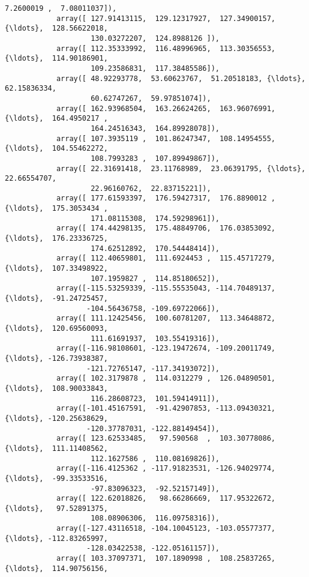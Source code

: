 \documentclass[11pt]{article}
\begin{document}
\begin{Verbatim}[commandchars=\\\{\}]
                    7.2600019 ,  7.08011037]),
            array([ 127.91413115,  129.12317927,  127.34900157, {\ldots},  128.56622018,
                    130.03272207,  124.8988126 ]),
            array([ 112.35333992,  116.48996965,  113.30356553, {\ldots},  114.90186901,
                    109.23586831,  117.38485586]),
            array([ 48.92293778,  53.60623767,  51.20518183, {\ldots},  62.15836334,
                    60.62747267,  59.97851074]),
            array([ 162.93968504,  163.26624265,  163.96076991, {\ldots},  164.4950217 ,
                    164.24516343,  164.89928078]),
            array([ 107.3935119 ,  101.86247347,  108.14954555, {\ldots},  104.55462272,
                    108.7993283 ,  107.89949867]),
            array([ 22.31691418,  23.11768989,  23.06391795, {\ldots},  22.66554707,
                    22.96160762,  22.83715221]),
            array([ 177.61593397,  176.59427317,  176.8890012 , {\ldots},  175.3053434 ,
                    171.08115308,  174.59298961]),
            array([ 174.44298135,  175.48849706,  176.03853092, {\ldots},  176.23336725,
                    174.62512892,  170.54448414]),
            array([ 112.40659801,  111.6924453 ,  115.45717279, {\ldots},  107.33498922,
                    107.1959827 ,  114.85180652]),
            array([-115.53259339, -115.55535043, -114.70489137, {\ldots},  -91.24725457,
                   -104.56436758, -109.69722066]),
            array([ 111.12425456,  100.60781207,  113.34648872, {\ldots},  120.69560093,
                    111.61691937,  103.55419316]),
            array([-116.98108601, -123.19472674, -109.20011749, {\ldots}, -126.73938387,
                   -121.72765147, -117.34193072]),
            array([ 102.3179878 ,  114.0312279 ,  126.04890501, {\ldots},  108.90033843,
                    116.28608723,  101.59414911]),
            array([-101.45167591,  -91.42907853, -113.09430321, {\ldots}, -120.25638629,
                   -120.37787031, -122.88149454]),
            array([ 123.62533485,   97.590568  ,  103.30778086, {\ldots},  111.11408562,
                    112.1627586 ,  110.08169826]),
            array([-116.4125362 , -117.91823531, -126.94029774, {\ldots},  -99.33533516,
                    -97.83096323,  -92.52157149]),
            array([ 122.62018826,   98.66286669,  117.95322672, {\ldots},   97.52891375,
                    108.08906306,  116.09758316]),
            array([-127.43116518, -104.10045123, -103.05577377, {\ldots}, -112.83265997,
                   -128.03422538, -122.05161157]),
            array([ 103.37097371,  107.1890998 ,  108.25837265, {\ldots},  114.90756156,

\end{Verbatim}
\end{document}
